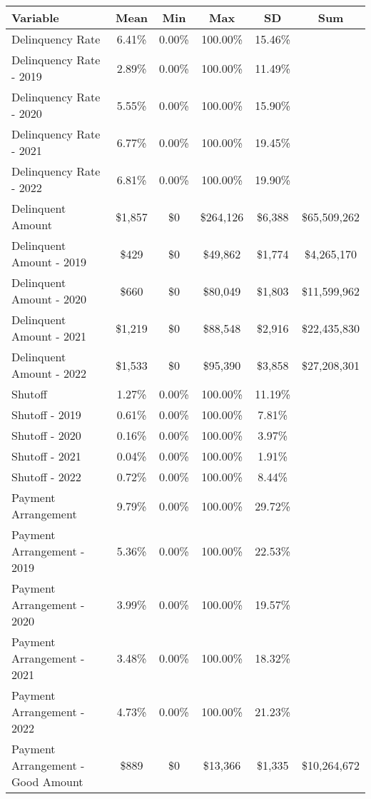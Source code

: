 \begin{tabular}{l|c|c|c|c|c}
\toprule 
\midrule 
Variable & Mean & Min & Max & SD & Sum \\
\midrule 
Delinquency Rate & 6.41\% & 0.00\% & 100.00\% & 15.46\% \\
\quad Delinquency Rate - 2019 & 2.89\% & 0.00\% & 100.00\% & 11.49\% \\
\quad Delinquency Rate - 2020 & 5.55\% & 0.00\% & 100.00\% & 15.90\% \\
\quad Delinquency Rate - 2021 & 6.77\% & 0.00\% & 100.00\% & 19.45\% \\
\quad Delinquency Rate - 2022 & 6.81\% & 0.00\% & 100.00\% & 19.90\% \\
\midrule 
Delinquent Amount & \$1,857 & \$0 & \$264,126 & \$6,388 & \$65,509,262 \\
\quad Delinquent Amount - 2019 & \$429 & \$0 & \$49,862 & \$1,774 & \$4,265,170 \\
\quad Delinquent Amount - 2020 & \$660 & \$0 & \$80,049 & \$1,803 & \$11,599,962 \\
\quad Delinquent Amount - 2021 & \$1,219 & \$0 & \$88,548 & \$2,916 & \$22,435,830 \\
\quad Delinquent Amount - 2022 & \$1,533 & \$0 & \$95,390 & \$3,858 & \$27,208,301 \\
\midrule 
Shutoff & 1.27\% & 0.00\% & 100.00\% & 11.19\% \\
\quad Shutoff - 2019 & 0.61\% & 0.00\% & 100.00\% & 7.81\% \\
\quad Shutoff - 2020 & 0.16\% & 0.00\% & 100.00\% & 3.97\% \\
\quad Shutoff - 2021 & 0.04\% & 0.00\% & 100.00\% & 1.91\% \\
\quad Shutoff - 2022 & 0.72\% & 0.00\% & 100.00\% & 8.44\% \\
\midrule 
Payment Arrangement & 9.79\% & 0.00\% & 100.00\% & 29.72\% \\
\quad Payment Arrangement - 2019 & 5.36\% & 0.00\% & 100.00\% & 22.53\% \\
\quad Payment Arrangement - 2020 & 3.99\% & 0.00\% & 100.00\% & 19.57\% \\
\quad Payment Arrangement - 2021 & 3.48\% & 0.00\% & 100.00\% & 18.32\% \\
\quad Payment Arrangement - 2022 & 4.73\% & 0.00\% & 100.00\% & 21.23\% \\
\quad Payment Arrangement - Good Amount & \$889 & \$0 & \$13,366 & \$1,335 & \$10,264,672 \\

\end{tabular}

